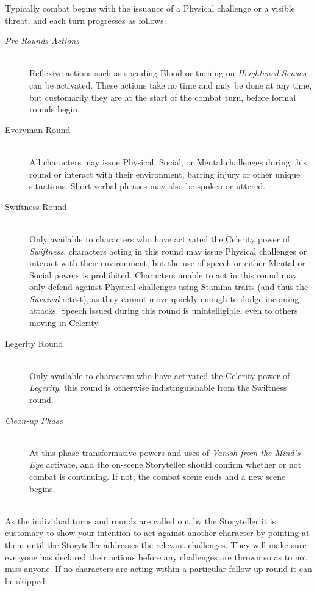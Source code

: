 Typically combat begins with the issuance of a Physical challenge or a visible threat, and each turn 
progresses as follows: \\

\HRule

\begin{description}
	\item[\emph{Pre-Rounds Actions}] \hfill \\
	Reflexive actions such as spending Blood or turning on \emph{Heightened Senses} can be activated. 
	These actions take no time and may be done at any time, but customarily they are at the start of 
	the combat turn, before formal rounds begin. \\
	\item[Everyman Round] \hfill \\
	All characters may issue Physical, Social, or Mental challenges during this round or interact with 
	their environment, barring injury or other unique situations.  Short verbal phrases may also be spoken 
	or uttered.
	\item[Swiftness Round] \hfill \\
	Only available to characters who have activated the Celerity power of \emph{Swiftness}, characters 
	acting in this round may issue Physical challenges or interact with their environment, but the use 
	of speech or either Mental or Social powers is prohibited.  Characters unable to act in this round 
	may only defend against Physical challenges using Stamina traits (and thus the \emph{Survival} retest), 
	as they cannot move quickly enough to dodge incoming attacks.  Speech issued during this round is 
	unintelligible, even to others moving in Celerity.
	\item[Legerity Round] \hfill \\
	Only available to characters who have activated the Celerity power of \emph{Legerity}, this round 
	is otherwise indistinguishable from the Swiftness round. \\
	\item[\emph{Clean-up Phase}] \hfill \\
	At this phase transformative powers and uses of \emph{Vanish from the Mind's Eye} activate, and 
	the on-scene Storyteller should confirm whether or not combat is continuing.  If not, the combat 
	scene ends and a new scene begins.
\end{description}
	
\HRule \\

\noindent As the individual turns and rounds are called out by the Storyteller it is customary to show your intention 
to act against another character by pointing at them until the Storyteller addresses the relevant challenges.  
They will make sure everyone has declared their actions before any challenges are thrown so as to not 
miss anyone.  If no characters are acting within a particular follow-up round it can be skipped.

